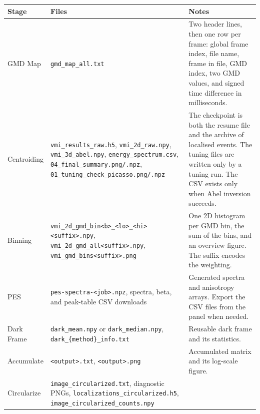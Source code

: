 \documentclass[11pt,a4paper]{article}
\newcommand{\code}[1]{\texttt{#1}}
\begin{document}
\begin{center}
\footnotesize
\begin{longtable}{@{}L{2.6cm}L{6.4cm}L{6.2cm}@{}}
\toprule
Stage & Files & Notes \\
\midrule
\endhead
\bottomrule
\endfoot
GMD Map & \code{gmd\_\allowbreak{}map\_\allowbreak{}all.\allowbreak{}txt} & Two header lines, then one row per
frame: global frame index, file name, frame in file, GMD index, two GMD
values, and signed time difference in milliseconds. \\
\addlinespace
Centroiding & \code{vmi\_\allowbreak{}results\_\allowbreak{}raw.\allowbreak{}h5}, \code{vmi\_\allowbreak{}2d\_\allowbreak{}raw.\allowbreak{}npy},
\code{vmi\_\allowbreak{}3d\_\allowbreak{}abel.npy}, \code{energy\_\allowbreak{}spectrum.\allowbreak{}csv},
\code{04\_\allowbreak{}final\_\allowbreak{}summary.png/\allowbreak{}.npz}, \code{01\_\allowbreak{}tuning\_\allowbreak{}check\_\allowbreak{}picasso.\allowbreak{}png/\allowbreak{}.\allowbreak{}npz}
& The checkpoint is both the resume file and the archive of localised
events. The tuning files are written only by a tuning run. The CSV exists
only when Abel inversion succeeds. \\
\addlinespace
Binning & \code{vmi\_\allowbreak{}2d\_\allowbreak{}gmd\_\allowbreak{}bin<b>\_\allowbreak{}<lo>\_\allowbreak{}<hi><suffix>.\allowbreak{}npy},
\code{vmi\_\allowbreak{}2d\_\allowbreak{}gmd\_\allowbreak{}all<suffix>.npy}, \code{vmi\_\allowbreak{}gmd\_\allowbreak{}bins<suffix>.\allowbreak{}png}
& One 2D histogram per GMD bin, the sum of the bins, and an overview
figure. The suffix encodes the weighting. \\
\addlinespace
PES & \code{pes-spectra-<job>.npz}, spectra, beta, and peak-table CSV downloads
& Generated spectra and anisotropy arrays. Export the CSV files from the
panel when needed. \\
\addlinespace
Dark Frame & \code{dark\_\allowbreak{}mean.\allowbreak{}npy} or \code{dark\_\allowbreak{}median.\allowbreak{}npy},
\code{dark\_\allowbreak{}\{method\}\_\allowbreak{}info.txt} & Reusable dark frame and its statistics. \\
\addlinespace
Accumulate & \code{<output>.\allowbreak{}txt}, \code{<output>.\allowbreak{}png} & Accumulated matrix
and its log-scale figure. \\
\addlinespace
Circularize & \code{image\_\allowbreak{}circularized.\allowbreak{}txt}, diagnostic PNGs,
\code{localizations\_\allowbreak{}circularized.h5},
\code{image\_\allowbreak{}circularized\_\allowbreak{}counts.npy} &

\end{longtable}
\end{center}
\end{document}
